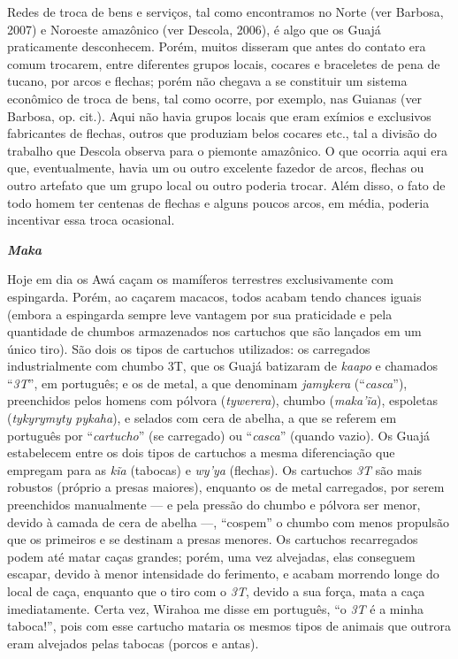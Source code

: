 Redes de troca de bens e serviços, tal como encontramos no Norte (ver
Barbosa, 2007) e Noroeste amazônico (ver Descola, 2006), é algo que os
Guajá praticamente desconhecem. Porém, muitos disseram que antes do
contato era comum trocarem, entre diferentes grupos locais, cocares e
braceletes de pena de tucano, por arcos e flechas; porém não chegava a
se constituir um sistema econômico de troca de bens, tal como ocorre,
por exemplo, nas Guianas (ver Barbosa, op. cit.). Aqui não havia grupos
locais que eram exímios e exclusivos fabricantes de flechas, outros que
produziam belos cocares etc., tal a divisão do trabalho que Descola
observa para o piemonte amazônico. O que ocorria aqui era que,
eventualmente, havia um ou outro excelente fazedor de arcos, flechas ou
outro artefato que um grupo local ou outro poderia trocar. Além disso, o
fato de todo homem ter centenas de flechas e alguns poucos arcos, em
média, poderia incentivar essa troca ocasional.

\textbf{\emph{Maka}}

Hoje em dia os Awá caçam os mamíferos terrestres exclusivamente com
espingarda. Porém, ao caçarem macacos, todos acabam tendo chances iguais
(embora a espingarda sempre leve vantagem por sua praticidade e pela
quantidade de chumbos armazenados nos cartuchos que são lançados em um
único tiro). São dois os tipos de cartuchos utilizados: os carregados
industrialmente com chumbo 3T, que os Guajá batizaram de \emph{kaapo} e
chamados ``\emph{3T}'', em português; e os de metal, a que denominam
\emph{jamykera} (``\emph{casca}''), preenchidos pelos homens com pólvora
(\emph{tywerera}), chumbo (\emph{maka'ĩa}), espoletas (\emph{tykyrymyty}
\emph{pykaha}), e selados com cera de abelha, a que se referem em
português por ``\emph{cartucho}'' (se carregado) ou ``\emph{casca}'' (quando
vazio). Os Guajá estabelecem entre os dois tipos de cartuchos a mesma
diferenciação que empregam para as \emph{kĩa} (tabocas) e \emph{wy'ya}
(flechas). Os cartuchos \emph{3T} são mais robustos (próprio a presas
maiores), enquanto os de metal carregados, por serem preenchidos
manualmente --- e pela pressão do chumbo e pólvora ser menor, devido à
camada de cera de abelha ---, ``cospem'' o chumbo com menos propulsão que
os primeiros e se destinam a presas menores. Os cartuchos recarregados
podem até matar caças grandes; porém, uma vez alvejadas, elas conseguem
escapar, devido à menor intensidade do ferimento, e acabam morrendo
longe do local de caça, enquanto que o tiro com o \emph{3T}, devido a
sua força, mata a caça imediatamente. Certa vez, Wirahoa me disse em
português, ``o \emph{3T} é a minha taboca!'', pois com esse cartucho
mataria os mesmos tipos de animais que outrora eram alvejados pelas
tabocas (porcos e antas).

